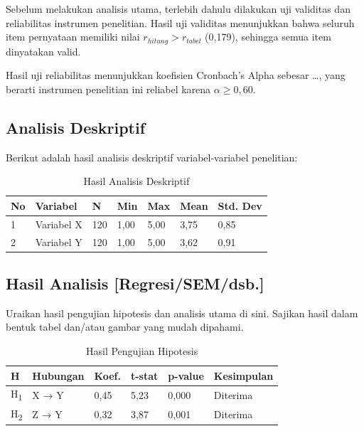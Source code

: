 Sebelum melakukan analisis utama, terlebih dahulu dilakukan uji validitas dan
reliabilitas instrumen penelitian. Hasil uji validitas menunjukkan bahwa seluruh
item pernyataan memiliki nilai $r_{hitung} > r_{tabel}$ (0,179), sehingga semua
item dinyatakan valid.

Hasil uji reliabilitas menunjukkan koefisien Cronbach's Alpha sebesar \ldots,
yang berarti instrumen penelitian ini reliabel karena $\alpha \geq 0,60$.

\subsection{Analisis Deskriptif}
\label{subsec:analisis-deskriptif}

Berikut adalah hasil analisis deskriptif variabel-variabel penelitian:

\begin{table}[H]
\caption{Hasil Analisis Deskriptif}
\label{tab:analisis-deskriptif}
\begin{isitable}
\begin{tabular}{p{0.5cm} p{3.5cm} p{2cm} p{2cm} p{2cm} p{2cm} p{2cm}}
\toprule
\textbf{No} & \textbf{Variabel} & \textbf{N} & \textbf{Min} & \textbf{Max} & \textbf{Mean} & \textbf{Std. Dev} \\
\midrule
1 & Variabel X & 120 & 1,00 & 5,00 & 3,75 & 0,85 \\
2 & Variabel Y & 120 & 1,00 & 5,00 & 3,62 & 0,91 \\
\bottomrule
\end{tabular}
\end{isitable}
\end{table}

\subsection{Hasil Analisis [Regresi/SEM/dsb.]}
\label{subsec:hasil-analisis}

Uraikan hasil pengujian hipotesis dan analisis utama di sini. Sajikan hasil dalam
bentuk tabel dan/atau gambar yang mudah dipahami.

\begin{table}[H]
\caption{Hasil Pengujian Hipotesis}
\label{tab:hasil-hipotesis}
\begin{isitable}
\begin{tabular}{p{0.5cm} p{3cm} p{2cm} p{2cm} p{2cm} p{3cm}}
\toprule
\textbf{H} & \textbf{Hubungan} & \textbf{Koef.} & \textbf{t-stat} & \textbf{p-value} & \textbf{Kesimpulan} \\
\midrule
H\textsubscript{1} & X → Y & 0,45 & 5,23 & 0,000 & Diterima \\
H\textsubscript{2} & Z → Y & 0,32 & 3,87 & 0,001 & Diterima \\
\bottomrule
\end{tabular}
\end{isitable}
\end{table}

